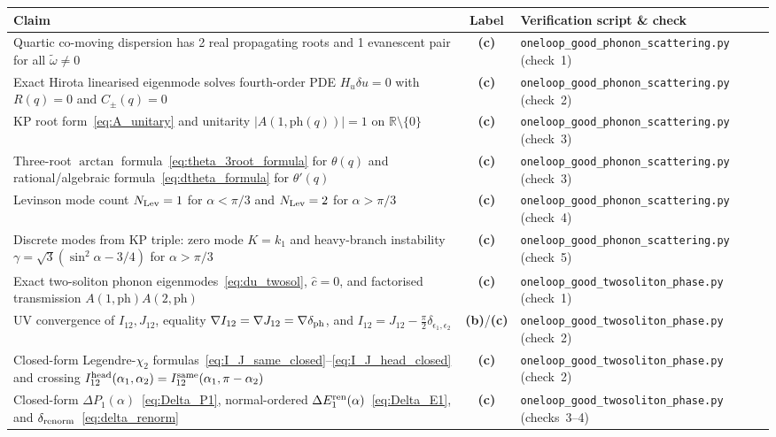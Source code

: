 \documentclass[11pt,a4paper]{article}
\newcommand{\Lb}{\textsf{\textbf{(b)}}}
\newcommand{\Lc}{\textsf{\textbf{(c)}}}
\theoremstyle{remark}
\begin{document}
\begin{center}\small
\begin{tabular}{@{}>{\raggedright\arraybackslash}p{6.9cm}c>{\raggedright\arraybackslash}p{6.5cm}@{}}\toprule
Claim & Label & Verification script \& check\\\midrule
Quartic co-moving dispersion has 2 real propagating roots and 1 evanescent pair for all $\tilde\omega\neq 0$ & \Lc & \texttt{oneloop\_good\_phonon\_scattering.py} (check~1)\\
Exact Hirota linearised eigenmode solves fourth-order PDE $H_u\delta u=0$ with $R(q)=0$ and $C_\pm(q)=0$ & \Lc & \texttt{oneloop\_good\_phonon\_scattering.py} (check~2)\\
KP root form~\eqref{eq:A_unitary} and unitarity $|A(1,\mathrm{ph}(q))|=1$ on $\mathbb{R}\setminus\{0\}$ & \Lc & \texttt{oneloop\_good\_phonon\_scattering.py} (check~3)\\
Three-root $\arctan$ formula~\eqref{eq:theta_3root_formula} for $\theta(q)$ and rational/algebraic formula~\eqref{eq:dtheta_formula} for $\theta'(q)$ & \Lc & \texttt{oneloop\_good\_phonon\_scattering.py} (check~3)\\
Levinson mode count $N_{\rm Lev}=1$ for $\alpha<\pi/3$ and $N_{\rm Lev}=2$ for $\alpha>\pi/3$ & \Lc & \texttt{oneloop\_good\_phonon\_scattering.py} (check~4)\\
Discrete modes from KP triple: zero mode $K=k_1$ and heavy-branch instability $\gamma=\sqrt{3}(\sin^2\alpha-3/4)$ for $\alpha>\pi/3$ & \Lc & \texttt{oneloop\_good\_phonon\_scattering.py} (check~5)\\
Exact two-soliton phonon eigenmodes~\eqref{eq:du_twosol}, $\hat{c}=0$, and factorised transmission $A(1,\mathrm{ph})A(2,\mathrm{ph})$ & \Lc & \texttt{oneloop\_good\_twosoliton\_phase.py} (check~1)\\
UV convergence of $I_{12},J_{12}$, equality $\nabla I_{12}=\nabla J_{12}=\nabla\delta_{\rm ph}$, and $I_{12}=J_{12}-\frac{\pi}{2}\delta_{\epsilon_1,\epsilon_2}$ & \Lb/\Lc & \texttt{oneloop\_good\_twosoliton\_phase.py} (check~2)\\
Closed-form Legendre-$\chi_2$ formulas~\eqref{eq:I_J_same_closed}--\eqref{eq:I_J_head_closed} and crossing $I_{12}^{\rm head}(\alpha_1,\alpha_2)=I_{12}^{\rm same}(\alpha_1,\pi-\alpha_2)$ & \Lc & \texttt{oneloop\_good\_twosoliton\_phase.py} (check~2)\\
Closed-form $\Delta P_1(\alpha)$~\eqref{eq:Delta_P1}, normal-ordered $\Delta E_1^{\rm ren}(\alpha)$~\eqref{eq:Delta_E1}, and $\delta_{\rm renorm}$~\eqref{eq:delta_renorm} & \Lc & \texttt{oneloop\_good\_twosoliton\_phase.py} (checks~3--4)\\

\end{tabular}
\end{center}
\end{document}
